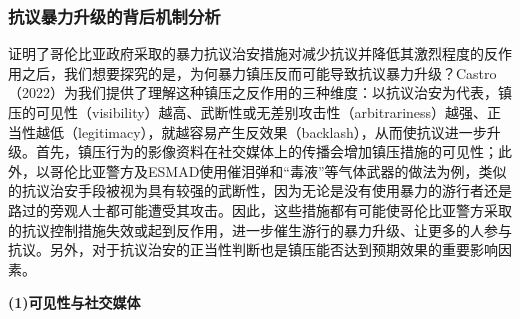\documentclass{phyasgn}\usepackage{nag}
\begin{document}
\subsubsection{抗议暴力升级的背后机制分析}
证明了哥伦比亚政府采取的暴力抗议治安措施对减少抗议并降低其激烈程度的反作用之后，我们想要探究的是，为何暴力镇压反而可能导致抗议暴力升级？Castro（2022）为我们提供了理解这种镇压之反作用的三种维度：以抗议治安为代表，镇压的可见性（visibility）越高、武断性或无差别攻击性（arbitrariness）越强、正当性越低（legitimacy），就越容易产生反效果（backlash），从而使抗议进一步升级。首先，镇压行为的影像资料在社交媒体上的传播会增加镇压措施的可见性；此外，以哥伦比亚警方及ESMAD使用催泪弹和“毒液”等气体武器的做法为例，类似的抗议治安手段被视为具有较强的武断性，因为无论是没有使用暴力的游行者还是路过的旁观人士都可能遭受其攻击。因此，这些措施都有可能使哥伦比亚警方采取的抗议控制措施失效或起到反作用，进一步催生游行的暴力升级、让更多的人参与抗议。另外，对于抗议治安的正当性判断也是镇压能否达到预期效果的重要影响因素。
\par\textbf{(1)可见性与社交媒体}
\end{document}
